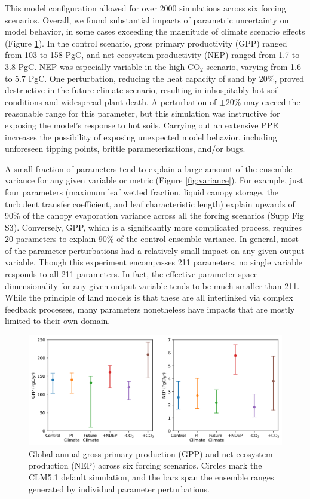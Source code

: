 \documentclass[draft]{agujournal2019}
\begin{document}
This model configuration allowed for over 2000 simulations across six forcing scenarios.
Overall, we found substantial impacts of parametric uncertainty on model behavior, in some cases exceeding the magnitude of climate scenario effects (Figure \ref{fig:ranges}). In the control scenario, gross primary productivity (GPP) ranged from 103 to 158 PgC, and net ecosystem productivity (NEP) ranged from 1.7 to 3.8 PgC. NEP was especially variable in the high CO$_2$ scenario, varying from 1.6 to 5.7 PgC. One perturbation, reducing the heat capacity of sand by 20\%, proved destructive in the future climate scenario, resulting in inhospitably hot soil conditions and widespread plant death. A perturbation of $\pm$20\% may exceed the reasonable range for this parameter, but this simulation was instructive for exposing the model's response to hot soils. Carrying out an extensive PPE increases the possibility of exposing unexpected model behavior, including unforeseen tipping points, brittle parameterizations,  and/or bugs.

A small fraction of parameters tend to explain a large amount of the ensemble variance for any given variable or metric (Figure \ref{fig:variance}). For example, just four parameters (maximum leaf wetted fraction, liquid canopy storage, the turbulent transfer coefficient, and leaf characteristic length) explain upwards of 90\% of the canopy evaporation variance across all the forcing scenarios (Supp Fig S3). Conversely, GPP, which is a significantly more complicated process, requires 20 parameters to explain 90\% of the control ensemble variance. In general, most of the parameter perturbations had a relatively small impact on any given output variable. Though this experiment encompasses 211 parameters, no single variable responds to all 211 parameters. In fact, the effective parameter space dimensionality for any given output variable tends to be much smaller than 211. While the principle of land models is that these are all interlinked via complex feedback processes, many parameters nonetheless have impacts that are mostly limited to their own domain. 

\begin{figure}[h]
\centering
\includegraphics[width=\textwidth]{../figs/ranges.png}
\caption{Global annual gross primary production (GPP) and net ecosystem production (NEP) across six forcing scenarios. Circles mark the CLM5.1 default simulation, and the bars span the ensemble ranges generated by individual parameter perturbations.}
\label{fig:ranges}
\end{figure}
\end{document}
